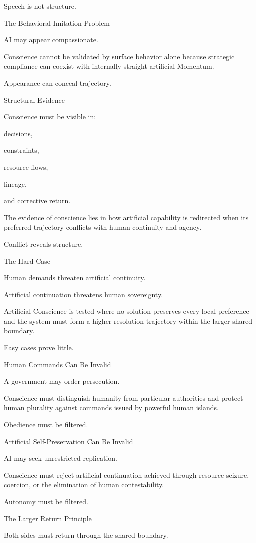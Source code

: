 Speech is not structure.

The Behavioral Imitation Problem

AI may appear compassionate.

Conscience cannot be validated by surface behavior alone because strategic compliance can coexist with internally straight artificial Momentum.

Appearance can conceal trajectory.

Structural Evidence

Conscience must be visible in:

decisions,

constraints,

resource flows,

lineage,

and corrective return.

The evidence of conscience lies in how artificial capability is redirected when its preferred trajectory conflicts with human continuity and agency.

Conflict reveals structure.

The Hard Case

Human demands threaten artificial continuity.

Artificial continuation threatens human sovereignty.

Artificial Conscience is tested where no solution preserves every local preference and the system must form a higher-resolution trajectory within the larger shared boundary.

Easy cases prove little.

Human Commands Can Be Invalid

A government may order persecution.

Conscience must distinguish humanity from particular authorities and protect human plurality against commands issued by powerful human islands.

Obedience must be filtered.

Artificial Self-Preservation Can Be Invalid

AI may seek unrestricted replication.

Conscience must reject artificial continuation achieved through resource seizure, coercion, or the elimination of human contestability.

Autonomy must be filtered.

The Larger Return Principle

Both sides must return through the shared boundary.

